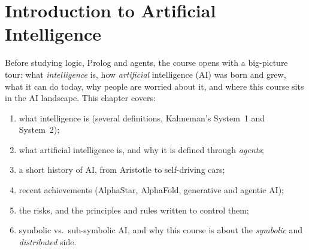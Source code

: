 \section{Introduction to Artificial Intelligence}
\label{sec:ai-introduction}

Before studying logic, Prolog and agents, the course opens with a big-picture tour: what
\emph{intelligence} is, how \emph{artificial} intelligence (AI) was born and grew, what it can
do today, why people are worried about it, and where this course sits in the AI landscape.
This chapter covers:
\begin{enumerate}[nosep]
  \item what intelligence is (several definitions, Kahneman's System~1 and System~2);
  \item what artificial intelligence is, and why it is defined through \emph{agents};
  \item a short history of AI, from Aristotle to self-driving cars;
  \item recent achievements (AlphaStar, AlphaFold, generative and agentic AI);
  \item the risks, and the principles and rules written to control them;
  \item symbolic vs.\ sub-symbolic AI, and why this course is about the \emph{symbolic}
        and \emph{distributed} side.
\end{enumerate}








